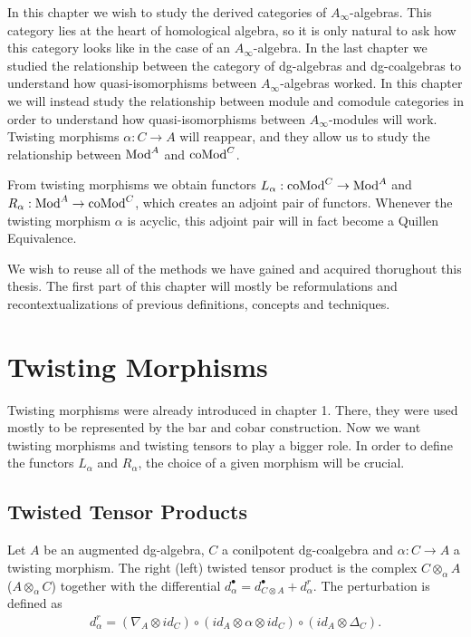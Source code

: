 \documentclass[../thesis.tex]{subfiles}
\begin{document}
    In this chapter we wish to study the derived categories of $A_\infty$-algebras. This category lies at the heart of homological algebra, so it is only natural to ask how this category looks like in the case of an $A_\infty$-algebra. In the last chapter we studied the relationship between the category of dg-algebras and dg-coalgebras to understand how quasi-isomorphisms between $A_\infty$-algebras worked. In this chapter we will instead study the relationship between module and comodule categories in order to understand how quasi-isomorphisms between $A_\infty$-modules will work. Twisting morphisms $\alpha : C \rightarrow A$ will reappear, and they allow us to study the relationship between $\tt{Mod}^A$ and $\tt{coMod}^C$.

    From twisting morphisms we obtain functors $L_\alpha : \tt{coMod}^C \rightarrow \tt{Mod}^A$ and $R_\alpha : \tt{Mod}^A \rightarrow \tt{coMod}^C$, which creates an adjoint pair of functors. Whenever the twisting morphism $\alpha$ is acyclic, this adjoint pair will in fact become a Quillen Equivalence.

    We wish to reuse all of the methods we have gained and acquired thorughout this thesis. The first part of this chapter will mostly be reformulations and recontextualizations of previous definitions, concepts and techniques. 

    \section{Twisting Morphisms}

        Twisting morphisms were already introduced in chapter 1. There, they were used mostly to be represented by the bar and cobar construction. Now we want twisting morphisms and twisting tensors to play a bigger role. In order to define the functors $L_\alpha$ and $R_\alpha$, the choice of a given morphism will be crucial.  

        \subsection{Twisted Tensor Products}

            Let $A$ be an augmented dg-algebra, $C$ a conilpotent dg-coalgebra and $\alpha : C \rightarrow A$ a twisting morphism. The right (left) twisted tensor product is the complex $C \otimes_\alpha A$ ($A\otimes_\alpha C$) together with the differential $d_\alpha^\bullet = d_{C\otimes A}^\bullet + d_\alpha^r$. The perturbation is defined as
            \begin{align*}
                d_\alpha^r = (\nabla_A\otimes id_C) \circ (id_A \otimes \alpha \otimes id_C) \circ (id_A \otimes \Delta_C).
            \end{align*}
\end{document}
